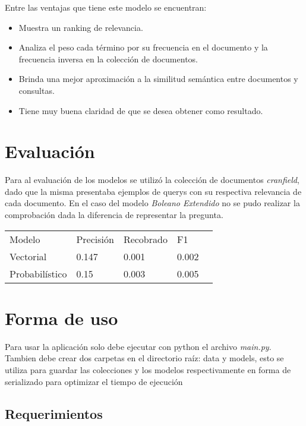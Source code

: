 \documentclass{llncs}
\begin{document}
	Entre las ventajas que tiene este modelo se encuentran:\\
	\begin{itemize}
		\item Muestra un ranking de relevancia.
		\item Analiza el peso cada t\'ermino por su frecuencia en el documento y la frecuencia inversa en la colecci\'on de documentos.
		\item Brinda una mejor aproximaci\'on a la similitud sem\'antica entre documentos y consultas.
		\item Tiene muy buena claridad de que se desea obtener como resultado.
	\end{itemize}

	\section{Evaluaci\'on}
	
    Para al evaluaci\'on de los modelos se utiliz\'o la colecci\'on de documentos \textit{cranfield}, 
	dado que la misma presentaba ejemplos de querys con su respectiva relevancia de cada documento. 
	En el caso del modelo \textit{Boleano Extendido} no se pudo realizar la comprobaci\'on dada la diferencia de representar la pregunta.\\

	\begin{table}[]
		\begin{tabular}{lllll}
		Modelo	&  Precisi\'on&  Recobrado & F1 \\
		Vectorial &	0.147 & 0.001 & 0.002 & \\
		Probabil\'istico & 0.15 & 0.003 & 0.005 &  \\
		\end{tabular}
	\end{table}

	\section{Forma de uso}
	
	Para usar la aplicaci\'on solo debe ejecutar con python el archivo \textit{main.py}. Tambien debe crear dos carpetas en el directorio ra\'iz: data y models, esto se utiliza para guardar las colecciones y los modelos respectivamente en forma de serializado para optimizar el tiempo de ejecuci\'on
	
	\subsection{Requerimientos}
	
\end{document}
